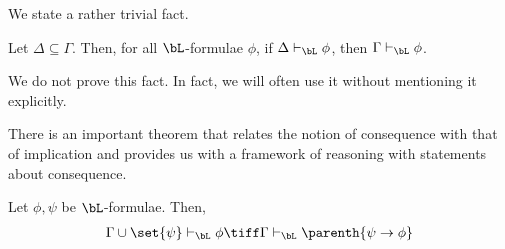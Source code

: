 We state a rather trivial fact.

\begin{boxlemma}\label{Ch1:Lemma:SubsetOfGamma}
    Let $\Delta \subseteq \Gamma$. Then, for all $\bL$-formulae $\phi$, if $\Delta \vdash_{\bL} \phi$, then $\Gamma \vdash_{\bL} \phi$.
\end{boxlemma}

We do not prove this fact. In fact, we will often use it without mentioning it explicitly.

There is an important theorem that relates the notion of consequence with that of implication and provides us with a framework of reasoning with statements about consequence.

\begin{boxtheorem}\label{Ch1:Thm:DeductionThm} %
    Let $\phi, \psi$ be $\bL$-formulae. Then,
    \begin{align*}
        \Gamma \cup \set{\psi} \vdash_{\bL} \phi
        \tiff
        \Gamma \vdash_{\bL} \parenth{\psi \to \phi}
    \end{align*}
\end{boxtheorem}
